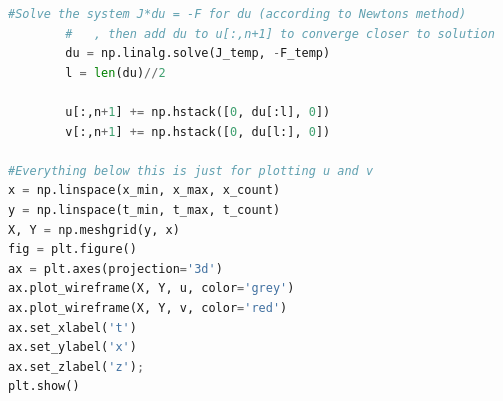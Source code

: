 \documentclass[11pt]{article}
\begin{document}
\begin{lstlisting}[language=Python]
        #Solve the system J*du = -F for du (according to Newtons method)
        #   , then add du to u[:,n+1] to converge closer to solution
        du = np.linalg.solve(J_temp, -F_temp)
        l = len(du)//2

        u[:,n+1] += np.hstack([0, du[:l], 0])
        v[:,n+1] += np.hstack([0, du[l:], 0])

#Everything below this is just for plotting u and v
x = np.linspace(x_min, x_max, x_count)
y = np.linspace(t_min, t_max, t_count)
X, Y = np.meshgrid(y, x)
fig = plt.figure()
ax = plt.axes(projection='3d')
ax.plot_wireframe(X, Y, u, color='grey')
ax.plot_wireframe(X, Y, v, color='red')
ax.set_xlabel('t')
ax.set_ylabel('x')
ax.set_zlabel('z');
plt.show()
\end{lstlisting}
\end{document}
